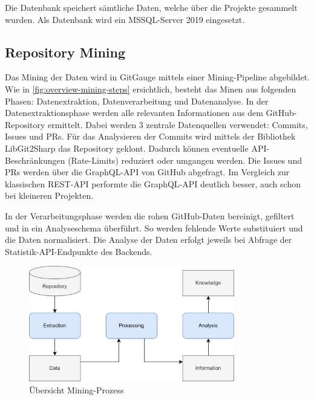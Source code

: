Die Datenbank speichert sämtliche Daten, welche über die Projekte gesammelt wurden. Als Datenbank wird ein MSSQL-Server 2019 eingesetzt. \parencite{grand_joel_vt1_joelgrand_repository_2024}

\subsection{Repository Mining}
Das Mining der Daten wird in GitGauge mittels einer Mining-Pipeline abgebildet. Wie in \autoref{fig:overview-mining-steps} ersichtlich, besteht das Minen aus folgenden Phasen: Datenextraktion, Datenverarbeitung und Datenanalyse. 
In der Datenextraktionsphase werden alle relevanten Informationen aus dem GitHub-Repository ermittelt. Dabei werden 3 zentrale Datenquellen verwendet: Commits, Issues und PRs. Für das Analysieren der Commits wird mittels der Bibliothek LibGit2Sharp das Repository geklont. Dadurch können eventuelle API-Beschränkungen (Rate-Limits) reduziert oder umgangen werden. Die Issues und PRs werden über die GraphQL-API von GitHub abgefragt. Im Vergleich zur klassischen REST-API performte die GraphQL-API deutlich besser, auch schon bei kleineren Projekten.  

In der Verarbeitungsphase werden die rohen GitHub-Daten bereinigt, gefiltert und in ein Analyseschema überführt. So werden fehlende Werte substituiert und die Daten normalisiert. 
Die Analyse der Daten erfolgt jeweils bei Abfrage der Statistik-API-Endpunkte des Backends. 

\begin{figure}[htbp]
    \centering
    \includegraphics[width=0.8\textwidth]{Figures/uebersicht-mining-prozess.png}
    \caption{Übersicht Mining-Prozess \parencite{grand_joel_vt1_joelgrand_repository_2024}}
    \label{fig:overview-mining-steps}
\end{figure}